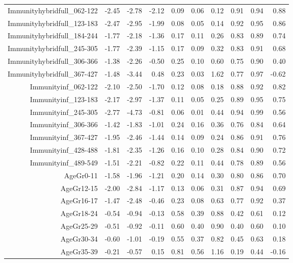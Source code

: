 \begin{table}[ht]
\begin{tabular}{rrrrrrrrrr}
  Immunityhybridfull\_062-122 & -2.45 & -2.78 & -2.12 & 0.09 & 0.06 & 0.12 & 0.91 & 0.94 & 0.88 \\ 
  Immunityhybridfull\_123-183 & -2.47 & -2.95 & -1.99 & 0.08 & 0.05 & 0.14 & 0.92 & 0.95 & 0.86 \\ 
  Immunityhybridfull\_184-244 & -1.77 & -2.18 & -1.36 & 0.17 & 0.11 & 0.26 & 0.83 & 0.89 & 0.74 \\ 
  Immunityhybridfull\_245-305 & -1.77 & -2.39 & -1.15 & 0.17 & 0.09 & 0.32 & 0.83 & 0.91 & 0.68 \\ 
  Immunityhybridfull\_306-366 & -1.38 & -2.26 & -0.50 & 0.25 & 0.10 & 0.60 & 0.75 & 0.90 & 0.40 \\ 
  Immunityhybridfull\_367-427 & -1.48 & -3.44 & 0.48 & 0.23 & 0.03 & 1.62 & 0.77 & 0.97 & -0.62 \\ 
  Immunityinf\_062-122 & -2.10 & -2.50 & -1.70 & 0.12 & 0.08 & 0.18 & 0.88 & 0.92 & 0.82 \\ 
  Immunityinf\_123-183 & -2.17 & -2.97 & -1.37 & 0.11 & 0.05 & 0.25 & 0.89 & 0.95 & 0.75 \\ 
  Immunityinf\_245-305 & -2.77 & -4.73 & -0.81 & 0.06 & 0.01 & 0.44 & 0.94 & 0.99 & 0.56 \\ 
  Immunityinf\_306-366 & -1.42 & -1.83 & -1.01 & 0.24 & 0.16 & 0.36 & 0.76 & 0.84 & 0.64 \\ 
  Immunityinf\_367-427 & -1.95 & -2.46 & -1.44 & 0.14 & 0.09 & 0.24 & 0.86 & 0.91 & 0.76 \\ 
  Immunityinf\_428-488 & -1.81 & -2.35 & -1.26 & 0.16 & 0.10 & 0.28 & 0.84 & 0.90 & 0.72 \\ 
  Immunityinf\_489-549 & -1.51 & -2.21 & -0.82 & 0.22 & 0.11 & 0.44 & 0.78 & 0.89 & 0.56 \\ 
  AgeGr0-11 & -1.58 & -1.96 & -1.21 & 0.20 & 0.14 & 0.30 & 0.80 & 0.86 & 0.70 \\ 
  AgeGr12-15 & -2.00 & -2.84 & -1.17 & 0.13 & 0.06 & 0.31 & 0.87 & 0.94 & 0.69 \\ 
  AgeGr16-17 & -1.47 & -2.48 & -0.46 & 0.23 & 0.08 & 0.63 & 0.77 & 0.92 & 0.37 \\ 
  AgeGr18-24 & -0.54 & -0.94 & -0.13 & 0.58 & 0.39 & 0.88 & 0.42 & 0.61 & 0.12 \\ 
  AgeGr25-29 & -0.51 & -0.92 & -0.11 & 0.60 & 0.40 & 0.90 & 0.40 & 0.60 & 0.10 \\ 
  AgeGr30-34 & -0.60 & -1.01 & -0.19 & 0.55 & 0.37 & 0.82 & 0.45 & 0.63 & 0.18 \\ 
  AgeGr35-39 & -0.21 & -0.57 & 0.15 & 0.81 & 0.56 & 1.16 & 0.19 & 0.44 & -0.16 \\ 

\end{tabular}
\end{table}
